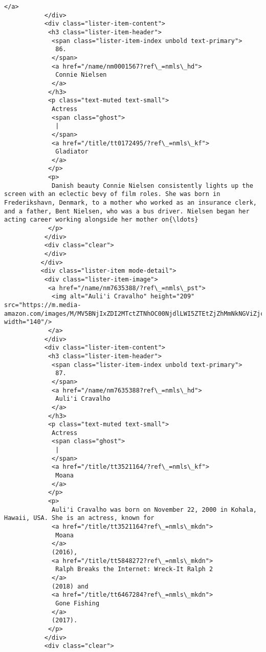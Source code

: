 \documentclass[11pt]{article}
\begin{document}
\begin{Verbatim}[commandchars=\\\{\}]
            </a>
           </div>
           <div class="lister-item-content">
            <h3 class="lister-item-header">
             <span class="lister-item-index unbold text-primary">
              86.
             </span>
             <a href="/name/nm0001567?ref\_=nmls\_hd">
              Connie Nielsen
             </a>
            </h3>
            <p class="text-muted text-small">
             Actress
             <span class="ghost">
              |
             </span>
             <a href="/title/tt0172495/?ref\_=nmls\_kf">
              Gladiator
             </a>
            </p>
            <p>
             Danish beauty Connie Nielsen consistently lights up the screen with an eclectic bevy of film roles. She was born in Frederikshavn, Denmark, to a mother who worked as an insurance clerk, and a father, Bent Nielsen, who was a bus driver. Nielsen began her acting career working alongside her mother on{\ldots}
            </p>
           </div>
           <div class="clear">
           </div>
          </div>
          <div class="lister-item mode-detail">
           <div class="lister-item-image">
            <a href="/name/nm7635388/?ref\_=nmls\_pst">
             <img alt="Auli'i Cravalho" height="209" src="https://m.media-amazon.com/images/M/MV5BNjIxZDI2MTctZTNhOC00NjdlLWI5ZTEtZjZhMmNkNGViZjczXkEyXkFqcGdeQXVyMTE5ODYzODk@.\_V1\_UY209\_CR6,0,140,209\_AL\_.jpg" width="140"/>
            </a>
           </div>
           <div class="lister-item-content">
            <h3 class="lister-item-header">
             <span class="lister-item-index unbold text-primary">
              87.
             </span>
             <a href="/name/nm7635388?ref\_=nmls\_hd">
              Auli'i Cravalho
             </a>
            </h3>
            <p class="text-muted text-small">
             Actress
             <span class="ghost">
              |
             </span>
             <a href="/title/tt3521164/?ref\_=nmls\_kf">
              Moana
             </a>
            </p>
            <p>
             Auli'i Cravalho was born on November 22, 2000 in Kohala, Hawaii, USA. She is an actress, known for
             <a href="/title/tt3521164?ref\_=nmls\_mkdn">
              Moana
             </a>
             (2016),
             <a href="/title/tt5848272?ref\_=nmls\_mkdn">
              Ralph Breaks the Internet: Wreck-It Ralph 2
             </a>
             (2018) and
             <a href="/title/tt6467284?ref\_=nmls\_mkdn">
              Gone Fishing
             </a>
             (2017).
            </p>
           </div>
           <div class="clear">

\end{Verbatim}
\end{document}
